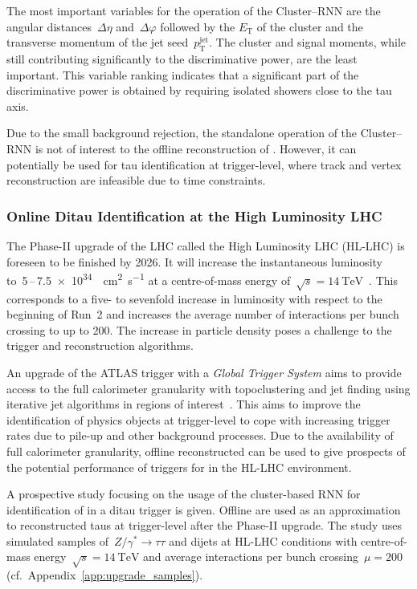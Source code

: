 The most important variables for the operation of the Cluster--RNN are the
angular distances~$\Delta \eta$ and~$\Delta \varphi$ followed by the
$E_\text{T}$ of the cluster and the transverse momentum of the jet
seed~$p_\text{T}^\text{jet}$. The cluster and signal moments, while still
contributing significantly to the discriminative power, are the least important.
This variable ranking indicates that a significant part of the discriminative
power is obtained by requiring isolated showers close to the tau axis.

Due to the small background rejection, the standalone operation of the
Cluster--RNN is not of interest to the offline reconstruction of \tauhadvis.
However, it can potentially be used for tau identification at trigger-level,
where track and vertex reconstruction are infeasible due to time constraints.

\subsubsection{Online Ditau Identification at the High Luminosity LHC}
\label{sec:hlt_rate_reduction}

The Phase-II upgrade of the LHC called the High Luminosity LHC (HL-LHC) is
foreseen to be finished by 2026. It will increase the instantaneous luminosity
to~\num{5}\,--\,\SI{7.5e34}{\per\square\centi\metre\per\second} at a
centre-of-mass energy
of~$\sqrt{s} = \SI{14}{\TeV}$~\cite{hl_lhc_prelim_design_report}. This
corresponds to a five- to sevenfold increase in luminosity with respect to the
beginning of Run~2 and increases the average number of interactions per bunch
crossing to up to \num{200}. The increase in particle density poses a challenge
to the trigger and reconstruction algorithms.

An upgrade of the ATLAS trigger with a \emph{Global Trigger System} aims to
provide access to the full calorimeter granularity with topoclustering and jet
finding using iterative jet algorithms in regions of
interest~\cite{phase_2_scoping}. This aims to improve the identification of
physics objects at trigger-level to cope with increasing trigger rates due to
pile-up and other background processes. Due to the availability of full
calorimeter granularity, offline reconstructed \tauhadvis can be used to give
prospects of the potential performance of triggers for \tauhadvis in the HL-LHC
environment.

A prospective study focusing on the usage of the cluster-based RNN for
identification of \tauhadvis in a ditau trigger is given. Offline \tauhadvis are
used as an approximation to reconstructed taus at trigger-level after the
Phase-II upgrade. The study uses simulated samples
of~$Z / \gamma^* \to \tau \tau$ and dijets at HL-LHC conditions with
centre-of-mass energy~$\sqrt{s}=\SI{14}{\TeV}$ and average interactions per
bunch crossing~$\mu = 200$ (cf.\ Appendix~\ref{app:upgrade_samples}).

